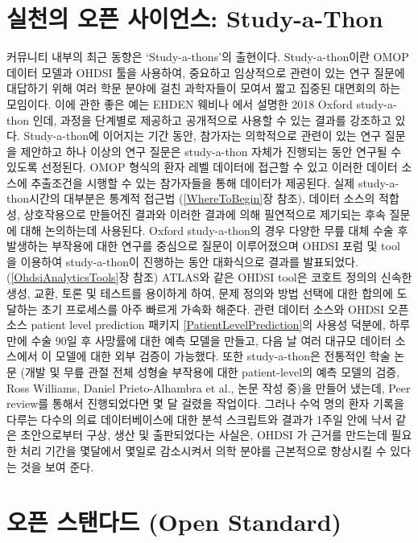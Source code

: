 \documentclass[11pt]{book}
\theoremstyle{definition}
\theoremstyle{definition}
\theoremstyle{definition}
\theoremstyle{remark}
\begin{document}
\section{실천의 오픈 사이언스: Study-a-Thon}\label{---study-a-thon}


커뮤니티 내부의 최근 동향은 `Study-a-thons'의 출현이다. Study-a-thon이란
OMOP 데이터 모델과 OHDSI 툴을 사용하여, 중요하고 임상적으로 관련이 있는
연구 질문에 대답하기 위해 여러 학문 분야에 걸친 과학자들이 모여서 짧고
집중된 대면회의 하는 모임이다. 이에 관한 좋은 예는 EHDEN 웨비나 에서
설명한 2018 Oxford study-a-thon 인데, 과정을 단계별로 제공하고
공개적으로 사용할 수 있는 결과를 강조하고 있다. Study-a-thon에 이어지는
기간 동안, 참가자는 의학적으로 관련이 있는 연구 질문을 제안하고 하나
이상의 연구 질문은 study-a-thon 자체가 진행되는 동안 연구될 수 있도록
선정된다. OMOP 형식의 환자 레벨 데이터에 접근할 수 있고 이러한 데이터
소스에 추출조건을 시행할 수 있는 참가자들을 통해 데이터가 제공된다. 실제
study-a-thon시간의 대부분은 통계적 접근법 (\ref{WhereToBegin}장 참조),
데이터 소스의 적합성, 상호작용으로 만들어진 결과와 이러한 결과에 의해
필연적으로 제기되는 후속 질문에 대해 논의하는데 사용된다. Oxford
study-a-thon의 경우 다양한 무릎 대체 수술 후 발생하는 부작용에 대한
연구를 중심으로 질문이 이루어졌으며 OHDSI 포럼 및 tool 을 이용하여
study-a-thon이 진행하는 동안 대화식으로 결과를 발표되었다.
(\ref{OhdsiAnalyticsTools}장 참조) ATLAS와 같은 OHDSI tool은 코호트
정의의 신속한 생성, 교환, 토론 및 테스트를 용이하게 하여, 문제 정의와
방법 선택에 대한 합의에 도달하는 초기 프로세스를 아주 빠르게 가속화
해준다. 관련 데이터 소스와 OHDSI 오픈소스 patient level prediction
패키지 \ref{PatientLevelPrediction}의 사용성 덕분에, 하루만에 수술 90일
후 사망률에 대한 예측 모델을 만들고, 다음 날 여러 대규모 데이터 소스에서
이 모델에 대한 외부 검증이 가능했다. 또한 study-a-thon은 전통적인 학술
논문 (개발 및 무릎 관절 전체 성형술 부작용에 대한 patient-level의 예측
모델의 검증, Ross Williams, Daniel Prieto-Alhambra et al., 논문 작성
중)을 만들어 냈는데, Peer review를 통해서 진행되었다면 몇 달 걸렸을
작업이다. 그러나 수억 명의 환자 기록을 다루는 다수의 의료 데이터베이스에
대한 분석 스크립트와 결과가 1주일 안에 낙서 같은 초안으로부터 구상, 생산
및 출판되었다는 사실은, OHDSI 가 근거를 만드는데 필요한 처리 기간을
몇달에서 몇일로 감소시켜서 의학 분야를 근본적으로 향상시킬 수 있다는
것을 보여 준다.

\section{오픈 스탠다드 (Open Standard)}\label{--open-standard}
\end{document}
